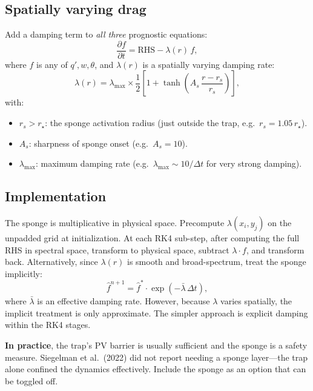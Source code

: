 \documentclass[11pt]{article}
\newcommand{\pderiv}[2]{\frac{\partial #1}{\partial #2}}
\newcommand{\hhat}[1]{\widehat{#1}}
\begin{document}
\subsection{Spatially varying drag}

Add a damping term to \emph{all three} prognostic equations:
\begin{equation}
\pderiv{f}{t} = \text{RHS} - \lambda(r)\,f,
\label{eq:sponge}
\end{equation}
where $f$ is any of $q', w, \theta$, and $\lambda(r)$ is a spatially varying damping rate:
\begin{equation}
\lambda(r) = \lambda_{\max} \times \frac{1}{2}\left[1 + \tanh\!\left(A_s\,\frac{r - r_s}{r_s}\right)\right],
\label{eq:lambda_sponge}
\end{equation}
with:
\begin{itemize}[nosep]
\item $r_s > r_\star$: the sponge activation radius (just outside the trap, e.g.\ $r_s = 1.05\,r_\star$).
\item $A_s$: sharpness of sponge onset (e.g.\ $A_s = 10$).
\item $\lambda_{\max}$: maximum damping rate (e.g.\ $\lambda_{\max} \sim 10/\Delta t$ for very strong damping).
\end{itemize}

\subsection{Implementation}

The sponge is multiplicative in physical space. Precompute $\lambda(x_i, y_j)$ on the unpadded grid at initialization. At each RK4 sub-step, after computing the full RHS in spectral space, transform to physical space, subtract $\lambda \cdot f$, and transform back. Alternatively, since $\lambda(r)$ is smooth and broad-spectrum, treat the sponge implicitly:
\begin{equation}
\hhat{f}^{n+1} = \hhat{f}^* \cdot \exp\!\left(-\bar\lambda\,\Delta t\right),
\end{equation}
where $\bar\lambda$ is an effective damping rate. However, because $\lambda$ varies spatially, the implicit treatment is only approximate. The simpler approach is explicit damping within the RK4 stages.

\textbf{In practice}, the trap's PV barrier is usually sufficient and the sponge is a safety measure. Siegelman et al.\ (2022) did not report needing a sponge layer---the trap alone confined the dynamics effectively. Include the sponge as an option that can be toggled off.
\end{document}

